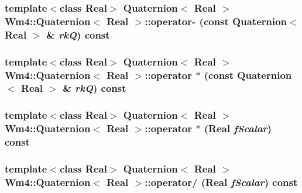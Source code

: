 \subsubsection{\setlength{\rightskip}{0pt plus 5cm}template$<$class Real$>$ {\bf Quaternion}$<$ Real $>$ {\bf Wm4::Quaternion}$<$ Real $>$::operator- (const {\bf Quaternion}$<$ Real $>$ \& {\em rk\-Q}) const\hspace{0.3cm}{\tt  [inline]}}\label{classWm4_1_1Quaternion_cd3975cac0be4c4399a2a7c5eab71ad9}


\subsubsection{\setlength{\rightskip}{0pt plus 5cm}template$<$class Real$>$ {\bf Quaternion}$<$ Real $>$ {\bf Wm4::Quaternion}$<$ Real $>$::operator $\ast$ (const {\bf Quaternion}$<$ Real $>$ \& {\em rk\-Q}) const\hspace{0.3cm}{\tt  [inline]}}\label{classWm4_1_1Quaternion_6bfd0d1486904570e2d5f8ab9c609714}


\subsubsection{\setlength{\rightskip}{0pt plus 5cm}template$<$class Real$>$ {\bf Quaternion}$<$ Real $>$ {\bf Wm4::Quaternion}$<$ Real $>$::operator $\ast$ (Real {\em f\-Scalar}) const\hspace{0.3cm}{\tt  [inline]}}\label{classWm4_1_1Quaternion_d42b7f0ebf0b164d3d6806078ffa5f6a}


\subsubsection{\setlength{\rightskip}{0pt plus 5cm}template$<$class Real$>$ {\bf Quaternion}$<$ Real $>$ {\bf Wm4::Quaternion}$<$ Real $>$::operator/ (Real {\em f\-Scalar}) const\hspace{0.3cm}{\tt  [inline]}}\label{classWm4_1_1Quaternion_07c3d0f906d7eda40d277380ca50b97f}


